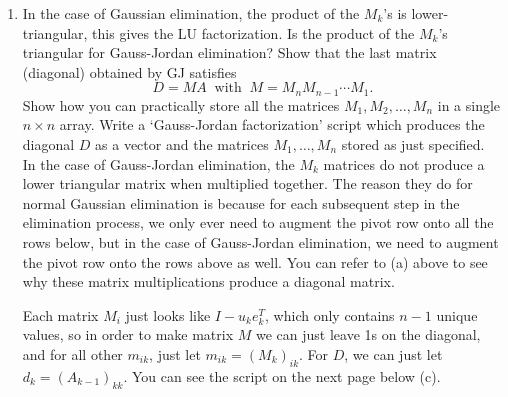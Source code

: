 \documentclass[11pt]{article}
\newcommand{\n}{\vspace{0.3cm}}
\begin{document}
\begin{enumerate}
\begin{enumerate}
\begin{proof}
\begin{align*}
\begin{array}{ccccccc}
						                    0           & 0           & \hdots & (A_k)_{k,k} & 0                   & \hdots & (A_k)_{k,n}     \\
						                    0           & 0           & \hdots & 0           & (A_k)_{(k+1),(k+1)} & \hdots & (A_k)_{(k+1),n} \\
						                    \vdots      & \vdots      & \ddots & \vdots      & \vdots              & \ddots & \vdots          \\
						                    0           & 0           & \hdots & 0           & 0                   & \hdots & (A_k)_{n,n}     \\
					                    \end{array}\right) \\
				            = A_{k+1}
			            \end{align*}
			            \normalsize Clearly the resultant matrix maintains the same characteristics as \(A_k\), but with another column zeroed out (except the pivot in position \((k+1,k+1)\)), so we can conclude that following the chain of steps mentioned above will finally terminate at \(A_n = D\) where \(D\) is diagonal.
		            \end{proof}

		      \item In the case of Gaussian elimination, the product of the \(M_k\)'s is lower-triangular, this gives the LU factorization.  Is the product of the \(M_k\)'s triangular for Gauss-Jordan elimination?  Show that the last matrix (diagonal) obtained by GJ satisfies
		            \[D = MA \;\; \text{with} \;\; M = M_n M_{n-1} \cdots M_1.\]
		            Show how you can practically store all the matrices \(M_1, M_2, \dots, M_n\) in a single \(n \times n\) array.  Write a `Gauss-Jordan factorization' script which produces the diagonal \(D\) as a vector and the matrices \(M_1, \dots, M_n\) stored as just specified. \n\\
		            In the case of Gauss-Jordan elimination, the \(M_k\) matrices do not produce a lower triangular matrix when multiplied together.  The reason they do for normal Gaussian elimination is because for each subsequent step in the elimination process, we only ever need to augment the pivot row onto all the rows below, but in the case of Gauss-Jordan elimination, we need to augment the pivot row onto the rows above as well.  You can refer to (a) above to see why these matrix multiplications produce a diagonal matrix. \n

		            Each matrix \(M_i\) just looks like \(I - u_ke_k^T\), which only contains \(n-1\) unique values, so in order to make matrix \(M\) we can just leave 1s on the diagonal, and for all other \(m_{ik}\), just let \(m_{ik} = (M_k)_{ik}\).  For \(D\), we can just let \(d_k = (A_{k-1})_{kk}\).  You can see the script on the next page below (c).
		            \newpage


\end{enumerate}
\end{enumerate}
\end{document}
